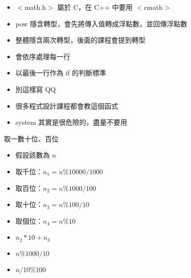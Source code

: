\documentclass[t]{beamer}
\begin{document}
\begin{frame}
  
  \begin{itemize}
    \item $<$math.h$>$ 屬於 C，在 C++ 中要用 $<$cmath$>$
  \end{itemize}
  \vspace{1.5em}
  
  \begin{itemize}
    \item pow 隱含轉型，會先將傳入值轉成浮點數，並回傳浮點數
    \item 整體隱含兩次轉型，後面的課程會提到轉型
  \end{itemize}
\end{frame}

\begin{frame}
  
  \begin{itemize}
    \item 會依序處理每一行
    \item 以最後一行作為 if 的判斷標準
    \item 別這樣寫 QQ
  \end{itemize}
\end{frame}

\begin{frame}
  
  \begin{itemize}
    \item 很多程式設計課程都會教這個函式
    \item system 其實是很危險的，盡量不要用
  \end{itemize}
\end{frame}

\begin{frame}{取一數十位、百位}
  \begin{itemize}
    \item 假設該數為 $n$
    \item 取千位：$n_1 = n \% 10000 / 1000$
    \item 取百位：$n_2 = n \% 1000 / 100$
    \item 取十位：$n_3 = n \% 100 / 10$
    \item 取個位：$n_4 = n \% 10$
  \end{itemize}
  \begin{itemize}
    \item $n_2 * 10 + n_3$
    \item $n \% 1000 / 10$
    \item $n / 10 \% 100$
  \end{itemize}
\end{frame}
\end{document}

